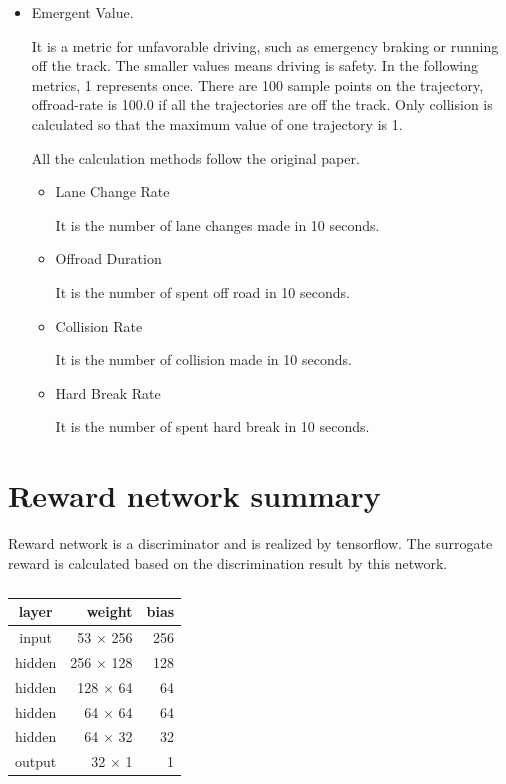 \begin{itemize}
\begin{itemize}
\end{itemize}




\item Emergent Value.

It is a metric for unfavorable driving, such as emergency braking or running off the track. The smaller values means driving is safety.
In the following metrics, 1 represents once.
There are 100 sample points on the trajectory, 
offroad-rate is 100.0 if all the trajectories are off the track.
Only collision is calculated so that the maximum value of one trajectory is 1.

All the calculation methods follow the original paper.\cite{DBLP:journals/corr/KueflerMWK17}


\begin{itemize}

\item Lane Change Rate

It is the number of lane changes made in 10 seconds.

\item Offroad Duration

It is the number of spent off road in 10 seconds.

\item Collision Rate

It is the number of collision made in 10 seconds.

\item Hard Break Rate

It is the number of spent hard break in 10 seconds.

\end{itemize}
\end{itemize}


\section{Reward network summary}

Reward network is a discriminator and is realized by tensorflow. The surrogate reward is calculated based on the discrimination result by this network.

\begin{table}[H]
\centering
\begin{tabular}{|c|r|r|}
\hline 
layer  & weight   & bias \\ \hline \hline
input  & 53 $\times$ 256 & 256  \\
hidden & 256 $\times$ 128 & 128 \\ 
hidden & 128 $\times$ 64 & 64 \\ 
hidden & 64 $\times$ 64 & 64 \\ 
hidden & 64 $\times$ 32 & 32 \\ 
output & 32 $\times$ 1 & 1 \\ 
\hline
\end{tabular} 
\caption{}
\label{tab:reward_network}
\end{table}


